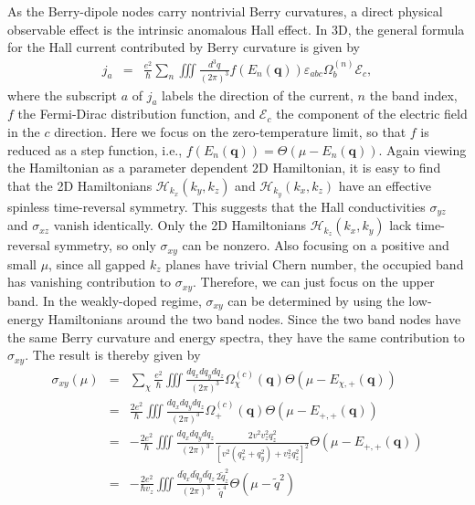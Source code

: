 \documentclass[aps,prl,twocolumn,longbibliography]{revtex4-1}
\newcommand{\bq}{\boldsymbol q}
\begin{document}
\begin{widetext}
As the Berry-dipole nodes carry nontrivial Berry curvatures, a direct physical observable effect is the intrinsic anomalous
Hall effect. In 3D, the general formula for the Hall current contributed by Berry curvature is given by
\begin{eqnarray}
	j_{a}&=&\frac{e^{2}}{\hbar}\sum_{n}\iiint\frac{d^{3}q}{(2\pi)^{3}}f(E_{n}(\bq))\varepsilon_{abc}\Omega_{b}^{(n)}\mathcal{E}_{c},
	\label{def: anomalous current}
\end{eqnarray}
where the subscript $a$ of $j_{a}$ labels the direction of the current, $n$  the band index,
$f$ the Fermi-Dirac distribution function, and  $\mathcal{E}_{c}$ the component of the electric
field in the $c$ direction. Here we focus on the zero-temperature limit, so that $f$ is reduced
as a step function, i.e., $f(E_{n}(\bq))=\Theta(\mu-E_{n}(\bq))$. Again viewing the Hamiltonian
as a parameter dependent 2D Hamiltonian, it is easy to find that the 2D
Hamiltonians $\mathcal{H}_{k_{x}}(k_{y},k_{z})$ and $\mathcal{H}_{k_{y}}(k_{x},k_{z})$ have
an effective spinless time-reversal symmetry.
This suggests that the Hall conductivities  $\sigma_{yz}$ and $\sigma_{xz}$ vanish identically. Only
the 2D Hamiltonians $\mathcal{H}_{k_{z}}(k_{x},k_{y})$ lack time-reversal symmetry,
so only $\sigma_{xy}$ can be nonzero. Also focusing on a positive and small
$\mu$, since all gapped $k_{z}$ planes have trivial Chern number, the occupied band
has vanishing contribution to $\sigma_{xy}$. Therefore, we can just focus on
the upper band. In the weakly-doped regime, $\sigma_{xy}$ can be determined by
using the low-energy Hamiltonians around the two band nodes. Since the two
band nodes have the same Berry curvature and energy spectra, they have the same
contribution to $\sigma_{xy}$. The result is thereby given by
\begin{eqnarray}
\sigma_{xy}(\mu)&=&\sum_{\chi}\frac{e^{2}}{\hbar}\iiint \frac{dq_{x}dq_{y}dq_{z}}{(2\pi)^{3}}\Omega_{\chi}^{(c)}(\bq)\Theta(\mu-E_{\chi,+}(\bq))\nonumber\\
&=&\frac{2e^{2}}{\hbar}\iiint \frac{dq_{x}dq_{y}dq_{z}}{(2\pi)^{3}}\Omega_{+}^{(c)}(\bq)\Theta(\mu-E_{+,+}(\bq))\nonumber\\
&=&-\frac{2e^{2}}{\hbar}\iiint \frac{dq_{x}dq_{y}dq_{z}}{(2\pi)^{3}}\frac{2v^{2}v_{z}^{2}q_{z}^{2}}{[v^{2}(q_{x}^{2}+q_{y}^{2})
+v_{z}^{2}q_{z}^{2}]^{2}}\Theta(\mu-E_{+,+}(\bq))\nonumber\\
&=&-\frac{2e^{2}}{\hbar v_{z}}\iiint \frac{d\tilde{q}_{x}d\tilde{q}_{y}d\tilde{q}_{z}}{(2\pi)^{3}}\frac{2\tilde{q}_{z}^{2}}{\tilde{q}^{4}}\Theta(\mu-\tilde{q}^{2})\nonumber\\

\end{eqnarray}
\end{widetext}
\end{document}
